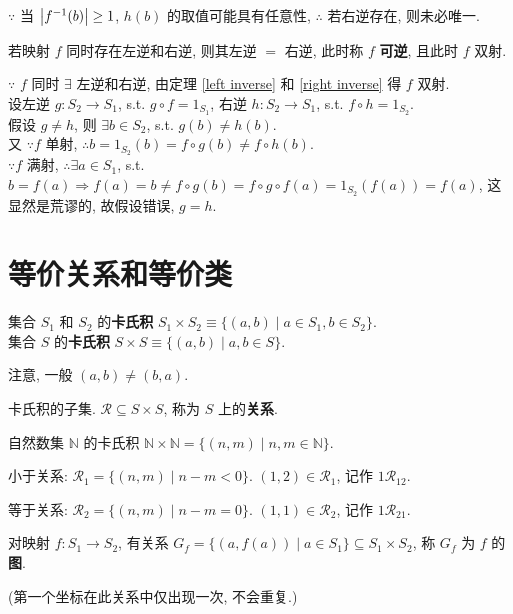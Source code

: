 \documentclass{note}
\begin{document}
$\because$ 当 $\left\lvert f^{-1}(b)\right\rvert\geq 1$, $h(b)$ 的取值可能具有任意性, $\therefore$ 若右逆存在, 则未必唯一.

\begin{thm}
    若映射 $f$ 同时存在左逆和右逆, 则其左逆 $=$ 右逆, 此时称 $f$ \textbf{可逆}, 且此时 $f$ 双射.
\end{thm}
\begin{pf}
    $\because$ $f$ 同时 $\exists$ 左逆和右逆, 由定理 \ref{left inverse} 和 \ref{right inverse} 得 $f$ 双射.\\
    设左逆 $g:S_2\rightarrow S_1$, s.t. $g\circ f=1_{S_1}$, 右逆 $h:S_2\rightarrow S_1$, s.t. $f\circ h=1_{S_2}$.\\
    假设 $g\neq h$, 则 $\exists b\in S_2$, s.t. $g(b)\neq h(b)$.\\
    又 $\because f$ 单射, $\therefore b=1_{S_2}(b)=f\circ g(b)\neq f\circ h(b)$.\\
    $\because f$ 满射, $\therefore\exists a\in S_1$, s.t. $b=f(a)\Longrightarrow f(a)=b\neq f\circ g(b)=f\circ g\circ f(a)=1_{S_2}(f(a))=f(a)$, 这显然是荒谬的, 故假设错误, $g=h$.
\end{pf}

\section{等价关系和等价类}
\begin{df}[卡氏积]
    集合 $S_1$ 和 $S_2$ 的\textbf{卡氏积} $S_1\times S_2\equiv\{(a,b)\mid a\in S_1,b\in S_2\}$.\\
    集合 $S$ 的\textbf{卡氏积} $S\times S\equiv\{(a,b)\mid a,b\in S\}$.
\end{df}
注意, 一般 $(a,b)\neq (b,a)$.

\begin{df}[关系]
    卡氏积的子集. $\mathcal{R}\subseteq S\times S$, 称为 $S$ 上的\textbf{关系}.
\end{df}

\begin{eg}
    自然数集 $\mathbb{N}$ 的卡氏积 $\mathbb{N}\times\mathbb{N}=\{(n,m)\mid n,m\in\mathbb{N}\}$.

    小于关系: $\mathcal{R}_1=\{(n,m)\mid n-m<0\}$. $(1,2)\in\mathcal{R}_1$, 记作 $1\mathcal{R}_12$.

    等于关系: $\mathcal{R}_2=\{(n,m)\mid n-m=0\}$. $(1,1)\in \mathcal{R}_2$, 记作 $1\mathcal{R}_21$.
\end{eg}

\begin{df}[图]
    对映射 $f:S_1\rightarrow S_2$, 有关系 $G_f=\{(a,f(a))\mid a\in S_1\}\subseteq S_1\times S_2$, 称 $G_f$ 为 $f$ 的\textbf{图}.
\end{df}
(第一个坐标在此关系中仅出现一次, 不会重复.)
\end{document}
